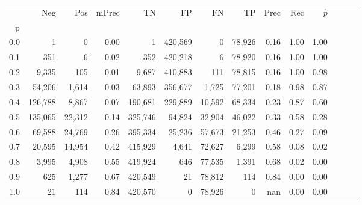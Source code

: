 \begin{tabular}{rrrrrrrrrrrrrr}
\toprule
{} &      Neg &     Pos & mPrec &       TN &       FP &      FN &      TP &  Prec &   Rec & $\hat{p}$ \\
p   &          &         &       &          &          &         &         &       &       &           \\
\midrule
0.0 &        1 &       0 &  0.00 &        1 &  420,569 &       0 &  78,926 &  0.16 &  1.00 &      1.00 \\
0.1 &      351 &       6 &  0.02 &      352 &  420,218 &       6 &  78,920 &  0.16 &  1.00 &      1.00 \\
0.2 &    9,335 &     105 &  0.01 &    9,687 &  410,883 &     111 &  78,815 &  0.16 &  1.00 &      0.98 \\
0.3 &   54,206 &   1,614 &  0.03 &   63,893 &  356,677 &   1,725 &  77,201 &  0.18 &  0.98 &      0.87 \\
0.4 &  126,788 &   8,867 &  0.07 &  190,681 &  229,889 &  10,592 &  68,334 &  0.23 &  0.87 &      0.60 \\
0.5 &  135,065 &  22,312 &  0.14 &  325,746 &   94,824 &  32,904 &  46,022 &  0.33 &  0.58 &      0.28 \\
0.6 &   69,588 &  24,769 &  0.26 &  395,334 &   25,236 &  57,673 &  21,253 &  0.46 &  0.27 &      0.09 \\
0.7 &   20,595 &  14,954 &  0.42 &  415,929 &    4,641 &  72,627 &   6,299 &  0.58 &  0.08 &      0.02 \\
0.8 &    3,995 &   4,908 &  0.55 &  419,924 &      646 &  77,535 &   1,391 &  0.68 &  0.02 &      0.00 \\
0.9 &      625 &   1,277 &  0.67 &  420,549 &       21 &  78,812 &     114 &  0.84 &  0.00 &      0.00 \\
1.0 &       21 &     114 &  0.84 &  420,570 &        0 &  78,926 &       0 &   nan &  0.00 &      0.00 \\
\bottomrule
\end{tabular}
